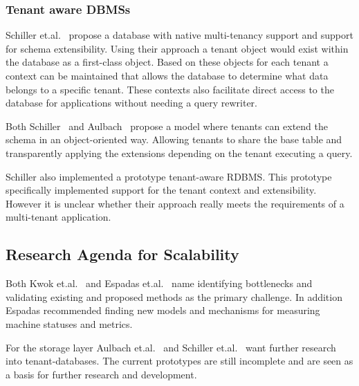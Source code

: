 
\subsubsection{Tenant aware \acp{DBMS}}
Schiller et.al.~\cite{schiller2011native} propose a database with native multi-tenancy support and support for schema extensibility.
Using their approach a tenant object would exist within the database as a first-class object. 
Based on these objects for each tenant a context can be maintained that allows the database to determine what data belongs to a specific tenant. 
These contexts also facilitate direct access to the database for applications without needing a query rewriter.

Both Schiller~\cite{schiller2011native} and Aulbach~\cite{aulbach2011extensibility} propose a model where tenants can extend the schema in an object-oriented way.
Allowing tenants to share the base table and transparently applying the extensions depending on the tenant executing a query.

Schiller also implemented a prototype tenant-aware \ac{RDBMS}.
This prototype specifically implemented support for the tenant context and extensibility.
However it is unclear whether their approach really meets the requirements of a multi-tenant application.



\subsection{Research Agenda for Scalability}
Both Kwok et.al.~\cite{kwok2008resource} and Espadas et.al.~\cite{espadas2013tenant} name identifying bottlenecks and validating existing and proposed methods as the primary challenge.
In addition Espadas recommended finding new models and mechanisms for measuring machine statuses and metrics.

For the storage layer Aulbach et.al.~\cite{aulbach2009comparison, aulbach2008multi} and Schiller et.al.~\cite{schiller2011native} want further research into tenant-databases. The current prototypes are still incomplete and are seen as a basis for further research and development.

